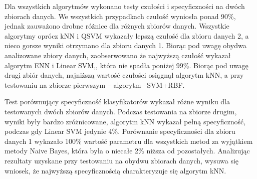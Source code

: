 \documentclass[[10pt,a4paper]{article}
\begin{document}
Dla wszystkich algorytmów wykonano testy czułości i specyficzności na dwóch zbiorach danych. We wszystkich przypadkach czułość wyniosła ponad 90\%, jednak zauważono drobne różnice dla różnych zbiorów danych. Wszystkie algorytmy oprócz kNN i QSVM wykazały lepszą czułość dla zbioru danych 2, a nieco gorsze wyniki otrzymano dla zbioru danych 1. Biorąc pod uwagę obydwa analizowane zbiory danych, zaobserwowano że najwyższą czułość wykazał algorytm ENN i Linear SVM,, która nie spadła poniżej 99\%. Biorąc pod uwagę drugi zbiór danych, najniższą wartość czułości osiągnął algorytm kNN, a przy testowaniu na zbiorze pierwszym – algorytm –SVM+RBF.

Test porównujący specyficzność klasyfikatorów wykazał różne wyniku dla testowanych dwóch zbiorów danych. Podczas testowania na zbiorze drugim, wyniki były bardzo zróżnicowane, algorytm kNN wykazał pełną specyficzność, podczas gdy Linear SVM jedynie 4\%. Porównanie specyficzności dla zbioru danych 1 wykazało 100\% wartość parametru dla wszystkich metod za wyjątkiem metody Naive Bayes, która była o niecałe 2\% niższa od pozostałych. Analizując rezultaty uzyskane przy testowaniu na obydwu zbiorach danych, wysuwa się wniosek, że najwyższą specyficznością charakteryzuje się algorytm kNN. 
\end{document}
